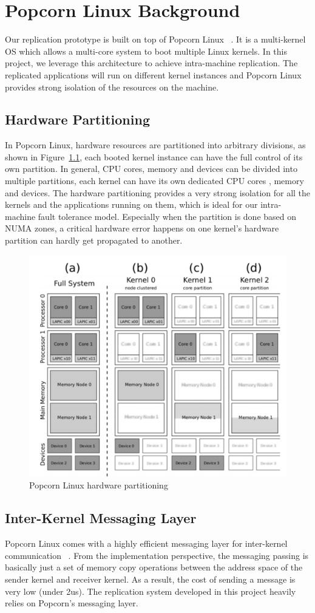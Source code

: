 \chapter{Popcorn Linux Background}
Our replication prototype is built on top of Popcorn Linux ~\cite{barbalace2014popcorn}. It is a multi-kernel OS which allows a multi-core system to boot multiple Linux kernels. In this project, we leverage this architecture to achieve intra-machine replication. The replicated applications will run on different kernel instances and Popcorn Linux provides strong isolation of the resources on the machine.
\section{Hardware Partitioning}
In Popcorn Linux, hardware resources are partitioned into arbitrary divisions, as shown in Figure~\ref{f:popcorn_arch}, each booted kernel instance can have the full control of its own partition. In general, CPU cores, memory and devices can be divided into multiple partitions, each kernel can have its own dedicated CPU cores , memory and devices. The hardware partitioning provides a very strong isolation for all the kernels and the applications running on them, which is ideal for our intra-machine fault tolerance model. Especially when the partition is done based on NUMA zones, a critical hardware error happens on one kernel's hardware partition can hardly get propagated to another.

\begin{figure}[!ht]
\centering
\includegraphics[width=.6\columnwidth]{figures/popcorn_arch}
 \caption{Popcorn Linux hardware partitioning}
 \label{f:popcorn_arch}
\end{figure}

\section{Inter-Kernel Messaging Layer}
Popcorn Linux comes with a highly efficient messaging layer for inter-kernel communication ~\cite{shelton2013popcorn}. From the implementation perspective, the messaging passing is basically just a set of memory copy operations between the address space of the sender kernel and receiver kernel. As a result, the cost of sending a message is very low (under 2us). The replication system developed in this project heavily relies on Popcorn’s messaging layer.

